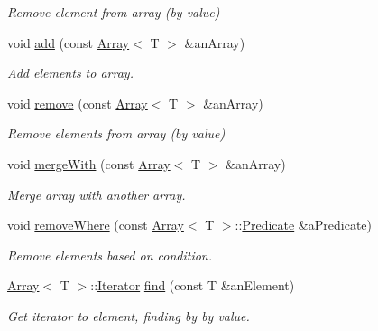 \begin{DoxyCompactItemize}
\begin{DoxyCompactList}\small\item\em Remove element from array (by value) \end{DoxyCompactList}\item 
void \hyperlink{classlibrary_1_1core_1_1ctnr_1_1Array_a8dd701c76ba2659ee2e438cff70fa971}{add} (const \hyperlink{classlibrary_1_1core_1_1ctnr_1_1Array}{Array}$<$ T $>$ \&an\+Array)
\begin{DoxyCompactList}\small\item\em Add elements to array. \end{DoxyCompactList}\item 
void \hyperlink{classlibrary_1_1core_1_1ctnr_1_1Array_ab37ca6fc14eefd1336544e05ba1b4d0e}{remove} (const \hyperlink{classlibrary_1_1core_1_1ctnr_1_1Array}{Array}$<$ T $>$ \&an\+Array)
\begin{DoxyCompactList}\small\item\em Remove elements from array (by value) \end{DoxyCompactList}\item 
void \hyperlink{classlibrary_1_1core_1_1ctnr_1_1Array_abe72cec38e65761df3eaddcfa9b7a44a}{merge\+With} (const \hyperlink{classlibrary_1_1core_1_1ctnr_1_1Array}{Array}$<$ T $>$ \&an\+Array)
\begin{DoxyCompactList}\small\item\em Merge array with another array. \end{DoxyCompactList}\item 
void \hyperlink{classlibrary_1_1core_1_1ctnr_1_1Array_a322b1bfc3a93ea18bf68eb0cff69e6d3}{remove\+Where} (const \hyperlink{classlibrary_1_1core_1_1ctnr_1_1Array}{Array}$<$ T $>$\+::\hyperlink{classlibrary_1_1core_1_1ctnr_1_1Array_a74cd325a740870aea490b6b739aa06ae}{Predicate} \&a\+Predicate)
\begin{DoxyCompactList}\small\item\em Remove elements based on condition. \end{DoxyCompactList}\item 
\hyperlink{classlibrary_1_1core_1_1ctnr_1_1Array}{Array}$<$ T $>$\+::\hyperlink{classlibrary_1_1core_1_1ctnr_1_1Array_a2364a34e7bc76d3661c3d89c4729a0e4}{Iterator} \hyperlink{classlibrary_1_1core_1_1ctnr_1_1Array_afece85f642e3c623bac197e25ad2d4ec}{find} (const T \&an\+Element)
\begin{DoxyCompactList}\small\item\em Get iterator to element, finding by by value. \end{DoxyCompactList}\end{DoxyCompactItemize}
